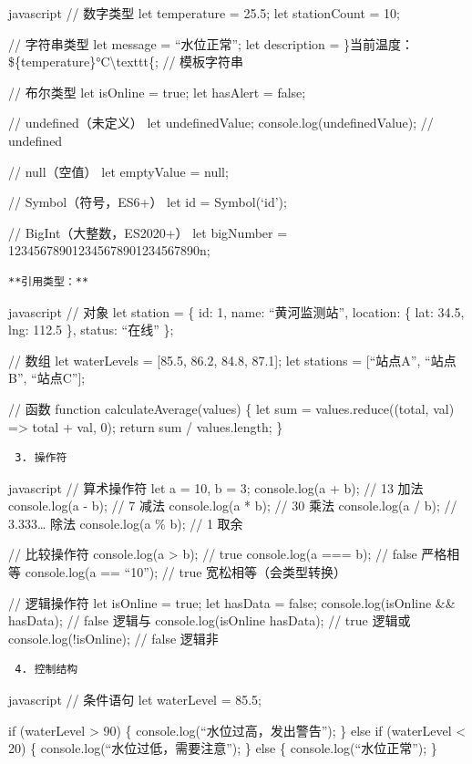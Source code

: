 javascript // 数字类型 let temperature = 25.5; let stationCount = 10;

// 字符串类型 let message = ``水位正常''; let description = \}当前温度：\$\{temperature\}°C\textbackslash texttt\{; // 模板字符串

// 布尔类型 let isOnline = true; let hasAlert = false;

// undefined（未定义） let undefinedValue; console.log(undefinedValue); // undefined

// null（空值） let emptyValue = null;

// Symbol（符号，ES6+） let id = Symbol(`id');

// BigInt（大整数，ES2020+） let bigNumber = 123456789012345678901234567890n;

\begin{lstlisting}
**引用类型：**
\end{lstlisting}

javascript // 对象 let station = \{ id: 1, name: ``黄河监测站'', location: \{ lat: 34.5, lng: 112.5 \}, status: ``在线'' \};

// 数组 let waterLevels = {[}85.5, 86.2, 84.8, 87.1{]}; let stations = {[}``站点A'', ``站点B'', ``站点C''{]};

// 函数 function calculateAverage(values) \{ let sum = values.reduce((total, val) =\textgreater{} total + val, 0); return sum / values.length; \}

\begin{lstlisting}
 3. 操作符
\end{lstlisting}

javascript // 算术操作符 let a = 10, b = 3; console.log(a + b); // 13 加法 console.log(a - b); // 7 减法 console.log(a * b); // 30 乘法 console.log(a / b); // 3.333\ldots{} 除法 console.log(a \% b); // 1 取余

// 比较操作符 console.log(a \textgreater{} b); // true console.log(a === b); // false 严格相等 console.log(a == ``10''); // true 宽松相等（会类型转换）

// 逻辑操作符 let isOnline = true; let hasData = false; console.log(isOnline \&\& hasData); // false 逻辑与 console.log(isOnline \textbar\textbar{} hasData); // true 逻辑或 console.log(!isOnline); // false 逻辑非

\begin{lstlisting}
 4. 控制结构
\end{lstlisting}

javascript // 条件语句 let waterLevel = 85.5;

if (waterLevel \textgreater{} 90) \{ console.log(``水位过高，发出警告''); \} else if (waterLevel \textless{} 20) \{ console.log(``水位过低，需要注意''); \} else \{ console.log(``水位正常''); \}

